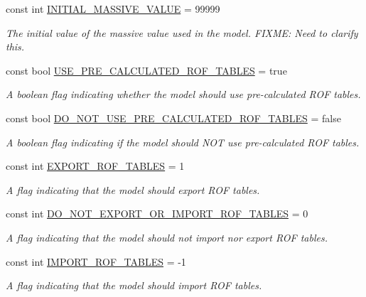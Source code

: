 \begin{DoxyCompactItemize}
const int \mbox{\hyperlink{classConstants_aac97910086c63a180ccdc3f8db62e34b}{I\+N\+I\+T\+I\+A\+L\+\_\+\+M\+A\+S\+S\+I\+V\+E\+\_\+\+V\+A\+L\+UE}} = 99999
\begin{DoxyCompactList}\small\item\em The initial value of the massive value used in the model. F\+I\+X\+ME\+: Need to clarify this. \end{DoxyCompactList}\item 
const bool \mbox{\hyperlink{classConstants_a0c69d51d8e08085d471b00c76429814d}{U\+S\+E\+\_\+\+P\+R\+E\+\_\+\+C\+A\+L\+C\+U\+L\+A\+T\+E\+D\+\_\+\+R\+O\+F\+\_\+\+T\+A\+B\+L\+ES}} = true
\begin{DoxyCompactList}\small\item\em A boolean flag indicating whether the model should use pre-\/calculated R\+OF tables. \end{DoxyCompactList}\item 
const bool \mbox{\hyperlink{classConstants_a192db63969de3947979b65b4b85f3c40}{D\+O\+\_\+\+N\+O\+T\+\_\+\+U\+S\+E\+\_\+\+P\+R\+E\+\_\+\+C\+A\+L\+C\+U\+L\+A\+T\+E\+D\+\_\+\+R\+O\+F\+\_\+\+T\+A\+B\+L\+ES}} = false
\begin{DoxyCompactList}\small\item\em A boolean flag indicating if the model should N\+OT use pre-\/calculated R\+OF tables. \end{DoxyCompactList}\item 
const int \mbox{\hyperlink{classConstants_a499714392cf1a633678cc58ebd2868fd}{E\+X\+P\+O\+R\+T\+\_\+\+R\+O\+F\+\_\+\+T\+A\+B\+L\+ES}} = 1
\begin{DoxyCompactList}\small\item\em A flag indicating that the model should export R\+OF tables. \end{DoxyCompactList}\item 
const int \mbox{\hyperlink{classConstants_a8237ceba4a3f169b0a547b6a6d794955}{D\+O\+\_\+\+N\+O\+T\+\_\+\+E\+X\+P\+O\+R\+T\+\_\+\+O\+R\+\_\+\+I\+M\+P\+O\+R\+T\+\_\+\+R\+O\+F\+\_\+\+T\+A\+B\+L\+ES}} = 0
\begin{DoxyCompactList}\small\item\em A flag indicating that the model should not import nor export R\+OF tables. \end{DoxyCompactList}\item 
const int \mbox{\hyperlink{classConstants_aa64d03395b183f56f6f79d0701324ad1}{I\+M\+P\+O\+R\+T\+\_\+\+R\+O\+F\+\_\+\+T\+A\+B\+L\+ES}} = -\/1
\begin{DoxyCompactList}\small\item\em A flag indicating that the model should import R\+OF tables. \end{DoxyCompactList}\item 

\end{DoxyCompactItemize}
